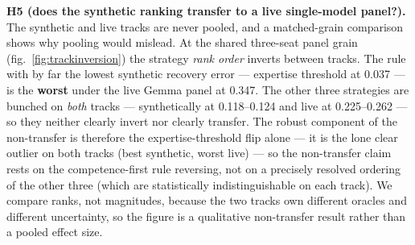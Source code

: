 \documentclass[
]{article}
\begin{document}
\textbf{H5 (does the synthetic ranking transfer to a live single-model
panel?).} The synthetic and live tracks are never pooled, and a
matched-grain comparison shows why pooling would mislead. At the shared
three-seat panel grain (fig.~\ref{fig:trackinversion}) the strategy
\emph{rank order} inverts between tracks. The rule with by far the
lowest synthetic recovery error --- expertise threshold at 0.037 --- is
the \textbf{worst} under the live Gemma panel at 0.347. The other three
strategies are bunched on \emph{both} tracks --- synthetically at
0.118--0.124 and live at 0.225--0.262 --- so they neither clearly invert
nor clearly transfer. The robust component of the non-transfer is
therefore the expertise-threshold flip alone --- it is the lone clear
outlier on both tracks (best synthetic, worst live) --- so the
non-transfer claim rests on the competence-first rule reversing, not on
a precisely resolved ordering of the other three (which are
statistically indistinguishable on each track). We compare ranks, not
magnitudes, because the two tracks own different oracles and different
uncertainty, so the figure is a qualitative non-transfer result rather
than a pooled effect size.
\end{document}
